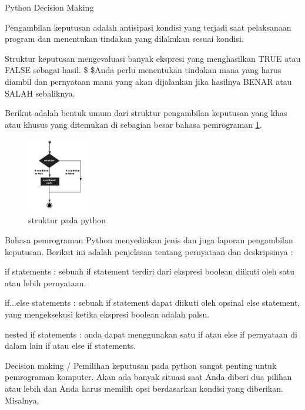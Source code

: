 \sloppy
Python Decision Making \par
\vspace{12pt}
\noindent 
Pengambilan keputusan adalah antisipasi kondisi yang terjadi saat pelaksanaan program dan menentukan tindakan yang dilakukan sesuai kondisi. \par
\vspace{12pt}
\noindent 
Struktur keputusan mengevaluasi banyak ekspresi yang menghasilkan TRUE atau FALSE sebagai hasil. \$  \$Anda perlu menentukan tindakan mana yang harus diambil dan pernyataan mana yang akan dijalankan jika hasilnya BENAR atau SALAH sebaliknya. \par
\vspace{12pt}
\noindent 
Berikut adalah bentuk umum dari struktur pengambilan keputusan yang khas atau khusus yang ditemukan di sebagian besar bahasa pemrograman
\ref{struktur}.
\begin{figure}[ht]
    \centerline{\includegraphics[width=0.25\textwidth]{figures/struktur.png}}
    \caption{struktur pada python}
    \label{struktur}
    \end{figure}\par
\vspace{12pt}
\noindent
Bahasa pemrograman Python menyediakan jenis dan juga laporan pengambilan keputusan. Berikut ini adalah penjelasan tentang pernyataan dan deskripsinya : \par
\vspace{12pt}
\item
if statements : sebuah if statement terdiri dari ekspresi boolean diikuti oleh satu atau lebih pernyataan. \par
\item
if...else statements : sebuah if statement dapat diikuti oleh opsinal else statement, yang mengeksekusi ketika ekspresi boolean adalah palsu. \par
\item
nested if statements : anda dapat menggunakan satu if atau else if pernyataan di dalam lain if atau else if statements. \par
\noindent 
Decision making / Pemilihan keputusan pada python sangat penting untuk pemrograman komputer. Akan ada banyak situasi saat Anda diberi dua pilihan atau lebih dan Anda harus memilih opsi berdasarkan kondisi yang diberikan. Misalnya,
